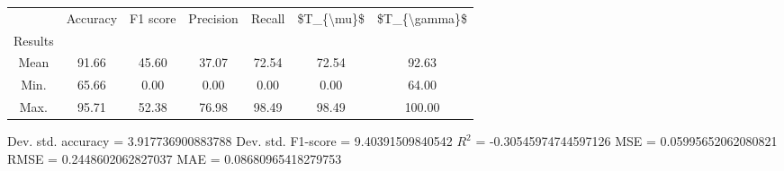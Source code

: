 \begin{tabular}{|c|c|c|c|c|c|c|}
\toprule
{} &  Accuracy &  F1 score &  Precision &  Recall &  \$T\_\{\textbackslash mu\}\$ &  \$T\_\{\textbackslash gamma\}\$ \\
Results &           &           &            &         &            &               \\
\hline
Mean    &     91.66 &     45.60 &      37.07 &   72.54 &      72.54 &         92.63 \\
Min.    &     65.66 &      0.00 &       0.00 &    0.00 &       0.00 &         64.00 \\
Max.    &     95.71 &     52.38 &      76.98 &   98.49 &      98.49 &        100.00 \\
\bottomrule
\end{tabular}

 Dev. std. accuracy = 3.917736900883788
 Dev. std. F1-score = 9.40391509840542
 $R^2$ = -0.30545974744597126
 MSE = 0.05995652062080821
 RMSE = 0.2448602062827037
 MAE = 0.08680965418279753